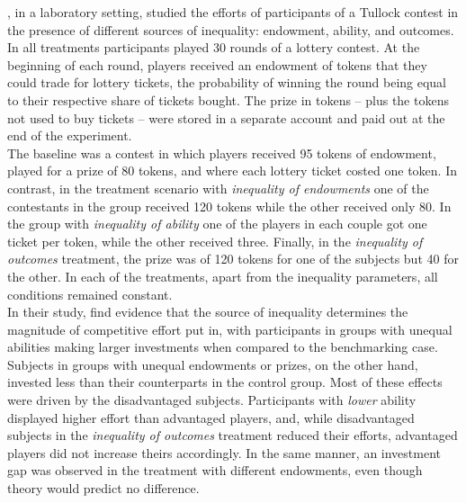 \cite{fallucchi2017}, in a laboratory setting, studied the efforts of participants of a Tullock contest in the presence of different sources of inequality: endowment, ability, and outcomes. In all treatments participants played 30 rounds of a lottery contest. At the beginning of each round, players received an endowment of tokens that they could trade for lottery tickets, the probability of winning the round being equal to their respective share of tickets bought. The prize in tokens -- plus the tokens not used to buy tickets -- were stored in a separate account and paid out at the end of the experiment.\\

The baseline was a contest in which players received 95 tokens of endowment, played for a prize of 80 tokens, and where each lottery ticket costed one token. In contrast, in the treatment scenario with \textit{inequality of endowments} one of the contestants in the group received 120 tokens while the other received only 80. In the group with \textit{inequality of ability} one of the players in each couple got one ticket per token, while the other received three. Finally, in the \textit{inequality of outcomes} treatment, the prize was of 120 tokens for one of the subjects but 40 for the other. In each of the treatments, apart from the inequality parameters, all conditions remained constant.\\

In their study, \citeauthor{fallucchi2017} find evidence that the source of inequality determines the magnitude of competitive effort put in, with participants in groups with unequal abilities making larger investments when compared to the benchmarking case. Subjects in groups with unequal endowments or prizes, on the other hand, invested less than their counterparts in the control group. Most of these effects were driven by the disadvantaged subjects. Participants with \textit{lower} ability displayed higher effort than advantaged players, and, while disadvantaged subjects in the \textit{inequality of outcomes} treatment reduced their efforts, advantaged players did not increase theirs accordingly. In the same manner, an investment gap was observed in the treatment with different endowments, even though theory would predict no difference.\\

